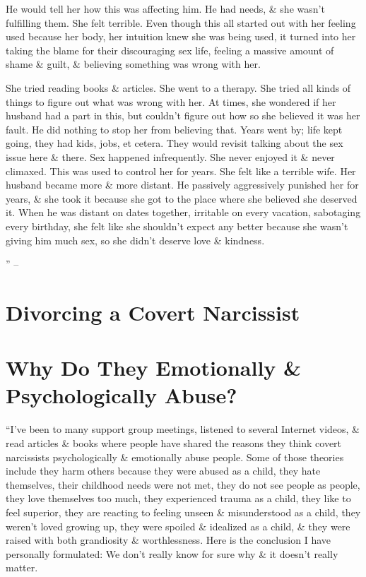 \documentclass{article}
\numberwithin{equation}{section}
\begin{document}
He would tell her how this was affecting him. He had needs, \& she wasn't fulfilling them. She felt terrible. Even though this all started out with her feeling used because her body, her intuition knew she was being used, it turned into her taking the blame for their discouraging sex life, feeling a massive amount of shame \& guilt, \& believing something was wrong with her.

She tried reading books \& articles. She went to a therapy. She tried all kinds of things to figure out what was wrong with her. At times, she wondered if her husband had a part in this, but couldn't figure out how so she believed it was her fault. He did nothing to stop her from believing that. Years went by; life kept going, they had kids, jobs, et cetera. They would revisit talking about the sex issue here \& there. Sex happened infrequently. She never enjoyed it \& never climaxed. This was used to control her for years. She felt like a terrible wife. Her husband became more \& more distant. He passively aggressively punished her for years, \& she took it because she got to the place where she believed she deserved it. When he was distant on dates together, irritable on every vacation, sabotaging every birthday, she felt like she shouldn't expect any better because she wasn't giving him much sex, so she didn't deserve love \& kindness.

'' -- \cite[pp. 105--118]{Mirza2017}


\section{Divorcing a Covert Narcissist}


\section{Why Do They Emotionally \& Psychologically Abuse?}
``I've been to many support group meetings, listened to several Internet videos, \& read articles \& books where people have shared the reasons they think covert narcissists psychologically \& emotionally abuse people. Some of those theories include they harm others because they were abused as a child, they hate themselves, their childhood needs were not met, they do not see people as people, they love themselves too much, they experienced trauma as a child, they like to feel superior, they are reacting to feeling unseen \& misunderstood as a child, they weren't loved growing up, they were spoiled \& idealized as a child, \& they were raised with both grandiosity \& worthlessness. Here  is the conclusion I have personally formulated: We don't really know for sure why \& it doesn't really matter.
\end{document}
